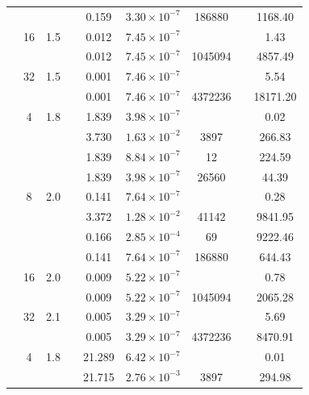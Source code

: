 \begin{table}[htbp]
\begin{tabular}{l S[table-format=3.0] S[table-format=4.1] l S[table-format=3.3] S[table-format=1.2e2] S[table-format=6.0] S[table-format=2.0] S[table-format=4.2]}
     &  &  &  & 0.159 & $3.30 \times 10^{-7}$ & 186880 & {\text{---}} & 1168.40 \\
     & 16 & 1.5 &  & 0.012 & $7.45 \times 10^{-7}$ & {\text{---}} & {\text{---}} & 1.43 \\
     &  &  &  & 0.012 & $7.45 \times 10^{-7}$ & 1045094 & {\text{---}} & 4857.49 \\
     & 32 & 1.5 &  & 0.001 & $7.46 \times 10^{-7}$ & {\text{---}} & {\text{---}} & 5.54 \\
     &  &  &  & 0.001 & $7.46 \times 10^{-7}$ & 4372236 & {\text{---}} & 18171.20 \\
    \midrule
     & 4 & 1.8 &  & 1.839 & $3.98 \times 10^{-7}$ & {\text{---}} & {\text{---}} & 0.02 \\
     &  &  &  & 3.730 & $1.63 \times 10^{-2}$ & 3897 & {\text{---}} & 266.83 \\
     &  &  &  & 1.839 & $8.84 \times 10^{-7}$ & 12 & {\text{---}} & 224.59 \\
     &  &  &  & 1.839 & $3.98 \times 10^{-7}$ & 26560 & {\text{---}} & 44.39 \\
     & 8 & 2.0 &  & 0.141 & $7.64 \times 10^{-7}$ & {\text{---}} & {\text{---}} & 0.28 \\
     &  &  &  & 3.372 & $1.28 \times 10^{-2}$ & 41142 & {\text{---}} & 9841.95 \\
     &  &  &  & 0.166 & $2.85 \times 10^{-4}$ & 69 & {\text{---}} & 9222.46 \\
     &  &  &  & 0.141 & $7.64 \times 10^{-7}$ & 186880 & {\text{---}} & 644.43 \\
     & 16 & 2.0 &  & 0.009 & $5.22 \times 10^{-7}$ & {\text{---}} & {\text{---}} & 0.78 \\
     &  &  &  & 0.009 & $5.22 \times 10^{-7}$ & 1045094 & {\text{---}} & 2065.28 \\
     & 32 & 2.1 &  & 0.005 & $3.29 \times 10^{-7}$ & {\text{---}} & {\text{---}} & 5.69 \\
     &  &  &  & 0.005 & $3.29 \times 10^{-7}$ & 4372236 & {\text{---}} & 8470.91 \\
    \midrule
     & 4 & 1.8 &  & 21.289 & $6.42 \times 10^{-7}$ & {\text{---}} & {\text{---}} & 0.01 \\
     &  &  &  & 21.715 & $2.76 \times 10^{-3}$ & 3897 & {\text{---}} & 294.98 \\

\end{tabular}
\end{table}
